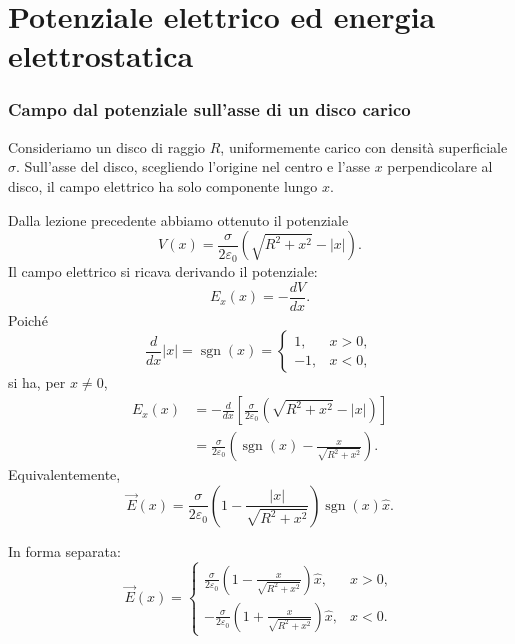 \documentclass[a4paper]{article}
\begin{document}
\pagebreak
\part{Potenziale elettrico ed energia elettrostatica}

\section{Campo dal potenziale sull'asse di un disco carico}

Consideriamo un disco di raggio \(R\), uniformemente carico con densità superficiale \(\sigma\). Sull'asse del disco, scegliendo l'origine nel centro e l'asse \(x\) perpendicolare al disco, il campo elettrico ha solo componente lungo \(x\).

Dalla lezione precedente abbiamo ottenuto il potenziale
\[
    V(x)=\frac{\sigma}{2\varepsilon_0}\left(\sqrt{R^2+x^2}-|x|\right).
\]
Il campo elettrico si ricava derivando il potenziale:
\[
    E_x(x)=-\frac{dV}{dx}.
\]
Poiché
\[
    \frac{d}{dx}|x|=\operatorname{sgn}(x)
    =
    \begin{cases}
        1, & x>0,\\
        -1, & x<0,
    \end{cases}
\]
si ha, per \(x\neq0\),
\begin{align*}
    E_x(x)
    &=-\frac{d}{dx}\left[\frac{\sigma}{2\varepsilon_0}\left(\sqrt{R^2+x^2}-|x|\right)\right] \\
    &=\frac{\sigma}{2\varepsilon_0}\left(\operatorname{sgn}(x)-\frac{x}{\sqrt{R^2+x^2}}\right).
\end{align*}
Equivalentemente,
\[
    \vec{E}(x)=\frac{\sigma}{2\varepsilon_0}\left(1-\frac{|x|}{\sqrt{R^2+x^2}}\right)\operatorname{sgn}(x)\hat{x}.
\]

In forma separata:
\[
    \vec{E}(x)=
    \begin{cases}
        \displaystyle \frac{\sigma}{2\varepsilon_0}\left(1-\frac{x}{\sqrt{R^2+x^2}}\right)\hat{x}, & x>0,\\[8pt]
        \displaystyle -\frac{\sigma}{2\varepsilon_0}\left(1+\frac{x}{\sqrt{R^2+x^2}}\right)\hat{x}, & x<0.
    \end{cases}
\]

\begin{center}
\end{center}
\end{document}
